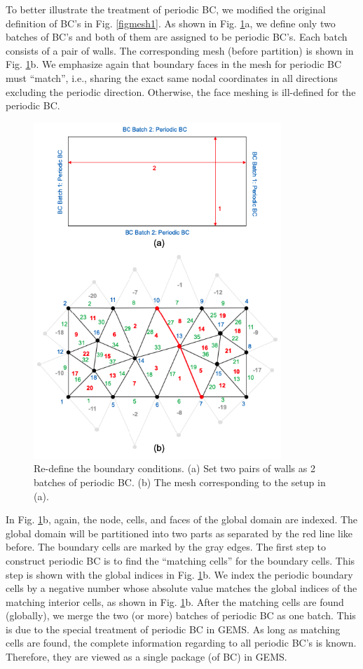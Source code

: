 \documentclass[12pt, letterpaper]{report}
\begin{document}
To better illustrate the treatment of periodic BC, we modified the original definition of BC's in
Fig. \ref{figmesh1}. As shown in Fig. \ref{figmesh5}a, we define only two batches of BC's and both of them are
assigned to be periodic BC's. Each batch consists of a pair of walls. The corresponding mesh (before
partition) is shown in Fig. \ref{figmesh5}b. We emphasize again that boundary faces in the mesh for periodic BC
must ``match'', i.e., sharing the exact same nodal coordinates in all directions excluding the
periodic direction. Otherwise, the face meshing is ill-defined for the periodic BC.

\begin{figure}[H]
   \centering
   \includegraphics[height=5in]{Mesh5.png}
   \caption{Re-define the boundary conditions. (a) Set two pairs of walls as 2 batches of periodic
   BC. (b) The mesh corresponding to the setup in (a).}
   \label{figmesh5}
\end{figure}
\paraspace

In Fig. \ref{figmesh5}b, again, the node, cells, and faces of the global domain are indexed. The
global domain will be partitioned into two parts as separated by the red line like before. The
boundary cells are marked by the gray edges. The first step to construct periodic BC is to find the
``matching cells'' for the boundary cells. This step is shown with the global indices in Fig.
\ref{figmesh5}b. We index the periodic boundary cells by a negative number whose absolute value
matches the global indices of the matching interior cells, as shown in Fig. \ref{figmesh5}b. After
the matching cells are found (globally), we merge the two (or more) batches of periodic BC as one
batch. This is due to the special treatment of periodic BC in GEMS. As long as matching cells are
found, the complete information regarding to all periodic BC's is known. Therefore, they are viewed
as a single package (of BC) in GEMS.  \paraspace
\end{document}
